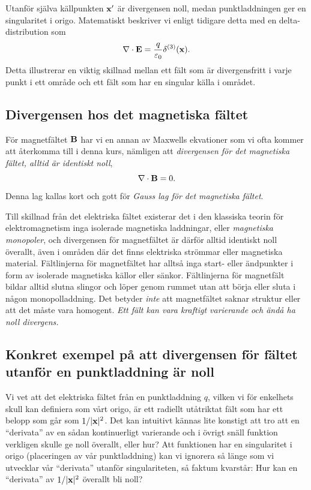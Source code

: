 Utanf{\"o}r sj{\"a}lva k{\"a}llpunkten ${\bf x}'$ {\"a}r divergensen noll,
medan punktladdningen ger en singularitet i origo. Matematiskt beskriver vi
enligt tidigare detta med en delta-distribution som
$$
  \nabla\cdot{\bf E} ={{q}\over{\varepsilon_0}}\delta^{(3)}({\bf x}).
$$
Detta illustrerar en viktig skillnad mellan ett f{\"a}lt som {\"a}r
divergensfritt i varje punkt i ett omr{\aa}de och ett f{\"a}lt som har
en singular k{\"a}lla i omr{\aa}det.

\subsection{Divergensen hos det magnetiska f{\"a}ltet}
F{\"o}r magnetf{\"a}ltet ${\bf B}$
har vi en annan av Maxwells ekvationer som vi ofta kommer att {\aa}terkomma
till i denna kurs, n{\"a}mligen att {\it divergensen f{\"o}r det magnetiska
f{\"a}ltet, alltid {\"a}r identiskt noll},
$$
  \nabla\cdot{\bf B}=0.
$$
Denna lag kallas kort och gott f{\"o}r {\it Gauss lag f{\"o}r det magnetiska
f{\"a}ltet}.

Till skillnad fr{\aa}n det elektriska f{\"a}ltet existerar det i den klassiska
teorin f{\"o}r elektromagnetism inga isolerade magnetiska laddningar, eller
{\it magnetiska monopoler}, och divergensen f{\"o}r magnetf{\"a}ltet {\"a}r
d{\"a}rf{\"o}r alltid identiskt noll {\"o}verallt, {\"a}ven i omr{\aa}den
d{\"a}r det finns elektriska str{\"o}mmar eller magnetiska material.
F{\"a}ltlinjerna f{\"o}r magnetf{\"a}ltet har allts{\aa} inga start- eller
{\"a}ndpunkter i form av isolerade magnetiska k{\"a}llor eller s{\"a}nkor.
F{\"a}ltlinjerna f{\"o}r magnetf{\"a}lt bildar alltid slutna slingor och
l{\"o}per genom rummet utan att b{\"o}rja eller sluta i n{\aa}gon
monopolladdning.
Det betyder {\it inte} att magnetf{\"a}ltet saknar struktur eller att det
m{\aa}ste vara homogent. {\it Ett f{\"a}lt kan vara kraftigt varierande och
{\"a}nd{\aa} ha noll divergens.}

\subsection{Konkret exempel p{\aa} att divergensen f{\"o}r f{\"a}ltet
  utanf{\"o}r en punktladdning {\"a}r noll}
Vi vet att det elektriska f{\"a}ltet fr{\aa}n en punktladdning $q$, vilken vi
f{\"o}r enkelhets skull kan definiera som v{\aa}rt origo, {\"a}r ett radiellt
ut{\aa}triktat f{\"a}lt som har ett belopp som g{\aa}r som $1/|{\bf x}|^2$.
Det kan intuitivt k{\"a}nnas lite konstigt att tro att en ``derivata'' av en
s{\aa}dan kontinuerligt varierande och i {\"o}vrigt sn{\"a}ll funktion
verkligen skulle ge noll {\"o}verallt, eller hur?
Att funktionen har en singularitet i origo (placeringen av v{\aa}r
punktladdning) kan vi ignorera s{\aa} l{\"a}nge som vi utvecklar v{\aa}r
``derivata'' utanf{\"o}r singulariteten, s{\aa} faktum kvarst{\aa}r:
Hur kan en ``derivata'' av  $1/|{\bf x}|^2$ {\"o}verallt bli noll?

